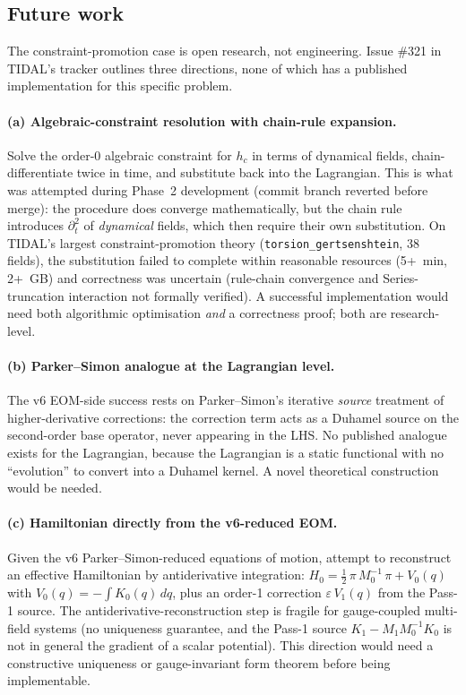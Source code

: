 \subsection{Future work}
\label{sec:pr-cb-future}

The constraint-promotion case is open research, not engineering.  Issue
\#321 in TIDAL's tracker outlines three directions, none of which has a
published implementation for this specific problem.

\paragraph{(a) Algebraic-constraint resolution with chain-rule expansion.}
Solve the order-0 algebraic constraint for $h_c$ in terms of dynamical
fields, chain-differentiate twice in time, and substitute back into the
Lagrangian.  This is what was attempted during Phase~2 development
(commit branch reverted before merge): the procedure does converge
mathematically, but the chain rule introduces $\partial_t^2$ of
\emph{dynamical} fields, which then require their own substitution.
On TIDAL's largest constraint-promotion theory
(\texttt{torsion\_gertsenshtein}, 38 fields), the substitution failed
to complete within reasonable resources (5+~min, 2+~GB) and
correctness was uncertain (rule-chain convergence and Series-truncation
interaction not formally verified).  A successful implementation would
need both algorithmic optimisation \emph{and} a correctness proof; both
are research-level.

\paragraph{(b) Parker--Simon analogue at the Lagrangian level.}
The v6 EOM-side success rests on Parker--Simon's iterative
\emph{source} treatment of higher-derivative corrections: the
correction term acts as a Duhamel source on the second-order base
operator, never appearing in the LHS.  No published analogue exists for
the Lagrangian, because the Lagrangian is a static functional with no
``evolution'' to convert into a Duhamel kernel.  A novel theoretical
construction would be needed.

\paragraph{(c) Hamiltonian directly from the v6-reduced EOM.}
Given the v6 Parker--Simon-reduced equations of motion, attempt to
reconstruct an effective Hamiltonian by antiderivative integration:
$H_0 = \tfrac{1}{2}\,\pi\, M_0^{-1}\, \pi + V_0(q)$ with
$V_0(q) = -\int K_0(q)\,dq$, plus an order-1 correction
$\varepsilon\, V_1(q)$ from the Pass-1 source.  The
antiderivative-reconstruction step is fragile for gauge-coupled
multi-field systems (no uniqueness guarantee, and the Pass-1 source
$K_1 - M_1 M_0^{-1} K_0$ is not in general the gradient of a scalar
potential).  This direction would need a constructive uniqueness or
gauge-invariant form theorem before being implementable.


